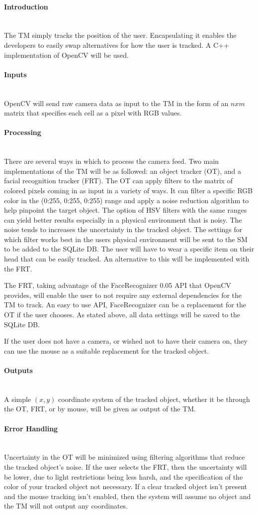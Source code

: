 \documentclass[titlepage]{article}
\newcommand{\myparagraph}[1]{\paragraph{#1}\mbox{}\\}
\begin{document}
\myparagraph{Introduction}
The TM simply tracks the position of the user. Encapsulating it enables the developers to easily swap alternatives for how the user is tracked. A C++ implementation of OpenCV will be used.

\myparagraph{Inputs}
OpenCV will send raw camera data as input to the TM in the form of an $nxm$ matrix that specifies each cell as a pixel with RGB values.

\myparagraph{Processing}
There are several ways in which to process the camera feed. Two main implementations of the TM will be as followed: an object tracker (OT), and a facial recognition tracker (FRT). The OT can apply filters to the matrix of colored pixels coming in as input in a variety of ways. It can filter a specific RGB color in the (0:255, 0:255, 0:255) range and apply a noise reduction algorithm to help pinpoint the target object. The option of HSV filters with the same ranges can yield better results especially in a physical environment that is noisy. The noise tends to increases the uncertainty in the tracked object. The settings for which filter works best in the users physical environment will be sent to the SM to be added to the SQLite DB. The user will have to wear a specific item on their head that can be easily tracked. An alternative to this will be implemented with the FRT.

The FRT, taking advantage of the FaceRecognizer 0.05 API that OpenCV provides, will enable the user to not require any external dependencies for the TM to track. An easy to use API, FaceRecognizer can be a replacement for the OT if the user chooses.  As stated above, all data settings will be saved to the SQLite DB.

If the user does not have a camera, or wished not to have their camera on, they can use the mouse as a suitable replacement for the tracked object. 

\myparagraph{Outputs}
A simple $(x,y)$ coordinate system of the tracked object, whether it be through the OT, FRT, or by mouse, will be given as output of the TM.

\myparagraph{Error Handling}
Uncertainty in the OT will be minimized using filtering algorithms that reduce the tracked object's noise. If the user selects the FRT, then the uncertainty will be lower, due to light restrictions being less harsh, and the specification of the color of your tracked object not necessary. If a clear tracked object isn't present and the mouse tracking isn't enabled, then the system will assume no object and the TM will not output any coordinates.
\end{document}
